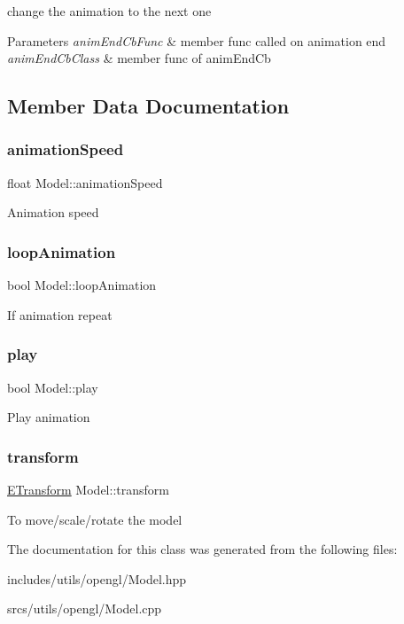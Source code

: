 change the animation to the next one 


\begin{DoxyParams}{Parameters}
{\em anim\+End\+Cb\+Func} & member func called on animation end \\
\hline
{\em anim\+End\+Cb\+Class} & member func of anim\+End\+Cb \\
\hline
\end{DoxyParams}


\subsection{Member Data Documentation}
\mbox{\label{class_model_a042a27427c802b5a7a6cee4a6ec07897}} 
\subsubsection{\texorpdfstring{animation\+Speed}{animationSpeed}}
{\footnotesize\ttfamily float Model\+::animation\+Speed}

Animation speed \mbox{\label{class_model_a1c1708f7513a39355120dc7428309e9e}} 
\subsubsection{\texorpdfstring{loop\+Animation}{loopAnimation}}
{\footnotesize\ttfamily bool Model\+::loop\+Animation}

If animation repeat \mbox{\label{class_model_aab41c5353b398ca56cc3e42724b02272}} 
\subsubsection{\texorpdfstring{play}{play}}
{\footnotesize\ttfamily bool Model\+::play}

Play animation \mbox{\label{class_model_a7b63d1be0afb6c145d1b97ac58a23a3a}} 
\subsubsection{\texorpdfstring{transform}{transform}}
{\footnotesize\ttfamily \hyperlink{class_e_transform}{E\+Transform} Model\+::transform}

To move/scale/rotate the model 

The documentation for this class was generated from the following files\+:\begin{DoxyCompactItemize}
\item 
includes/utils/opengl/Model.\+hpp\item 
srcs/utils/opengl/Model.\+cpp\end{DoxyCompactItemize}
